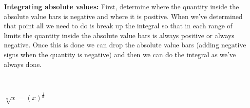 \begin{tiny}
    \textbf{Integrating absolute values:}
    First, determine where the quantity inside the absolute value bars is negative and where it is positive.
    When we’ve determined that point all we need to do is break up the integral so that in each range of limits
    the quantity inside the absolute value bars is always positive or always negative. Once this is done we can
    drop the absolute value bars (adding negative signs when the quantity is negative) and then we can do the
    integral as we’ve always done.
\end{tiny}\\
\begin{small}
    \begin{math}
        \sqrt[n] x = (x)^{\frac{1}{n}}
    \end{math}    
\end{small}
